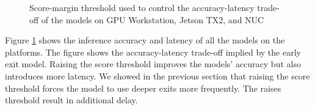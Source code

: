 \begin{figure}
	\caption[Score margin threshold and the Accuracy-Latency Trade-off]{Score-margin threshold used to control the accuracy-latency trade-off of the models on \protect{} GPU Workstation, \protect{} Jetson TX2, and \protect{} NUC }
	\label{fig:threshold-acc-lat-trade-off}
\end{figure}

Figure \ref{fig:threshold-acc-lat-trade-off} shows the inference accuracy and latency of all the models on the platforms. The figure shows the accuracy-latency trade-off implied by the early exit model.
Raising the score threshold improves the models' accuracy but also introduces more latency. We showed in the previous section that raising the score threshold forces the model to use deeper exits more frequently. The raises threshold result in additional delay. 

